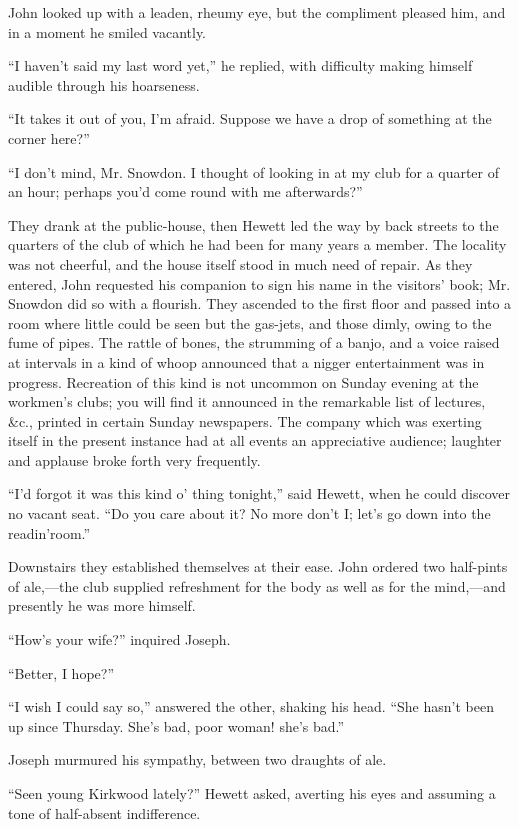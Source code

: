 John looked up with a leaden, rheumy eye, but the compliment pleased
him, and in a moment he smiled vacantly.

``I haven't said my last word yet,'' he replied, with difficulty making
himself audible through his hoarseness.

``It takes it out of you, I'm afraid. Suppose we have a drop of
something at the corner here?''

``I don't mind, Mr. Snowdon. I thought {}of looking in at my club for a
quarter of an hour; perhaps you'd come round with me afterwards?''

They drank at the public-house, then Hewett led the way by back streets
to the quarters of the club of which he had been for many years a
member. The locality was not cheerful, and the house itself stood in
much need of repair. As they entered, John requested his companion to
sign his name in the visitors' book; Mr. Snowdon did so with a flourish.
They ascended to the first floor and passed into a room where little
could be seen but the gas-jets, and those dimly, owing to the fume of
pipes. The rattle of bones, the strumming of a banjo, and a voice raised
at intervals in a kind of whoop announced that a nigger entertainment
was in progress. Recreation of this kind is not uncommon on Sunday
evening at the workmen's clubs; you will find it announced in the
remarkable list of lectures, \&c., printed in certain Sunday newspapers.
The company which was exerting itself in the present instance had at all
{}events an appreciative audience; laughter and applause broke forth
very frequently.

``I'd forgot it was this kind o' thing tonight,'' said Hewett, when he
could discover no vacant seat. ``Do you care about it? No more don't I;
let's go down into the readin'room.''

Downstairs they established themselves at their ease. John ordered two
half-pints of ale,---the club supplied refreshment for the body as well
as for the mind,---and presently he was more himself.

``How's your wife?'' inquired Joseph.

``Better, I hope?''

``I wish I could say so,'' answered the other, shaking his head. ``She
hasn't been up since Thursday. She's bad, poor woman! she's bad.''

Joseph murmured his sympathy, between two draughts of ale.

``Seen young Kirkwood lately?'' Hewett asked, averting his eyes and
assuming a tone of half-absent indifference.

